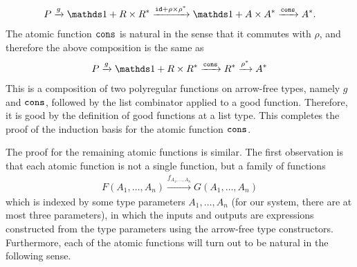 \begin{align*}
P \xrightarrow g  \onetype + R \times R^* \xrightarrow { \idterm + \rho \times \rho^*} \onetype + A \times A^* \xrightarrow \consterm A^*.
\end{align*}
The atomic function $\mathtt{cons}$ is natural in the sense that it commutes with $\rho$, and therefore the above composition is the same as
\begin{align*}
P \xrightarrow g  \onetype + R \times R^* \xrightarrow \consterm R^* \xrightarrow {\rho^*} A^*
\end{align*}
This is a composition of two polyregular functions on arrow-free types, namely $g$ and $\mathtt{cons}$, followed by the list combinator applied to a good function. Therefore, it is good by the definition of good functions at a list type. This completes the proof of the induction basis for the atomic function $\mathtt{cons}$.

The proof for the remaining atomic functions is similar. The first observation is that each atomic function is not a single function, but a family of functions 
\begin{align*}
F(A_1,\ldots,A_n) \xrightarrow {f_{A_1,\ldots,A_n}} G(A_1,\ldots,A_n)
\end{align*}
which is indexed by some type parameters $A_1,\ldots,A_n$ (for our system, there are at most three parameters), in which the inputs and outputs are expressions constructed from the type parameters using the arrow-free type constructors. Furthermore, each of the atomic functions will turn out to be natural in the following sense.

